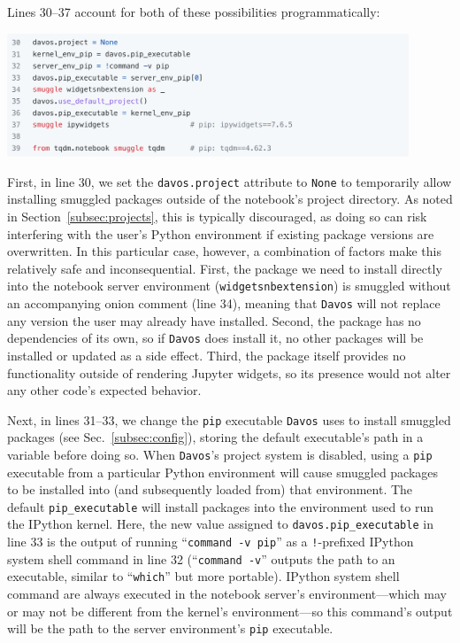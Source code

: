 \documentclass[preprint,12pt,a4paper]{elsarticle}
\begin{document}
Lines 30--37 account for both of these possibilities programmatically:
\begin{center}
\includegraphics[width=0.9\textwidth]{figs/example7}
\end{center}
First, in line 30, we set the \texttt{davos.project} attribute to \texttt{None} to temporarily
allow installing smuggled packages outside of the notebook's project directory.
As noted in Section~\ref{subsec:projects}, this is typically discouraged, as doing so can risk interfering with the user's Python environment if existing package versions are overwritten.
In this particular case, however, a combination of factors make this relatively safe and inconsequential.
First, the package we need to install directly into the notebook server environment (\texttt{widgetsnbextension}) is smuggled without an accompanying onion comment (line 34), meaning that \texttt{Davos} will not replace any version the user may already have installed.
Second, the package has no dependencies of its own, so if \texttt{Davos} does install it, no other packages will be installed or updated as a side effect.
Third, the package itself provides no functionality outside of rendering Jupyter widgets, so its presence would not alter any other code's expected behavior.

Next, in lines 31--33, we change the \texttt{pip} executable \texttt{Davos} uses to install smuggled packages (see Sec.~\ref{subsec:config}), storing the default executable's path in a variable before doing so.
When \texttt{Davos}'s project system is disabled, using a \texttt{pip} executable from a particular Python environment will cause smuggled packages to be installed into (and subsequently loaded from) that environment.
The default \texttt{pip\_executable} will install packages into the environment used to run the IPython kernel.
Here, the new value assigned to \texttt{davos.pip\_executable} in line 33 is the output of running ``\texttt{command -v pip}'' as a \mbox{\texttt{!}-prefixed} IPython system shell command in line 32 (``\texttt{command -v}'' outputs the path to an executable, similar to ``\texttt{which}'' but more portable).
IPython system shell command are always executed in the notebook server's environment---which may or may not be different from the kernel's environment---so this command's output will be the path to the server environment's \texttt{pip} executable.
\end{document}
